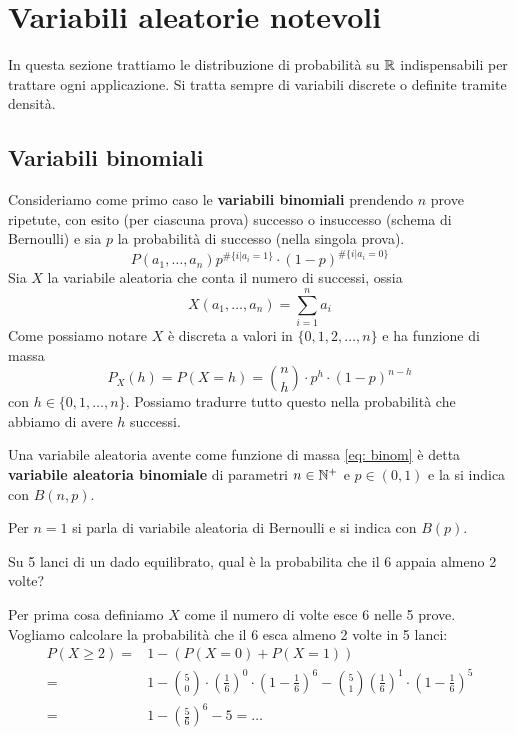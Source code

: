 \section{Variabili aleatorie notevoli}
In questa sezione trattiamo le distribuzione di probabilità su $\mathbb{R}$ indispensabili per trattare
ogni applicazione. Si tratta sempre di variabili discrete o definite tramite densità.

\subsection{Variabili binomiali}
Consideriamo come primo caso le \textbf{variabili binomiali} prendendo $n$ prove ripetute, con
esito (per ciascuna prova) successo o insuccesso (schema di Bernoulli) e sia $p$ la probabilità di
successo (nella singola prova).
\[ P(a_1, \dots, a_n) p^{\# \{i | a_i=1\}} \cdot (1-p)^{\# \{ i | a_i=0 \}} \]
Sia $X$ la variabile aleatoria che conta il numero di successi, ossia
\[ X(a_1, \dots, a_n) = \sum_{i=1}^n a_i \]
Come possiamo notare $X$ è discreta a valori in $\{0,1,2,\dots,n\}$ e ha funzione di massa
\begin{equation}\label{eq: binom}
	P_X(h) = P(X = h) = \binom{n}{h} \cdot p^h \cdot (1-p)^{n-h}
\end{equation}
con $h \in \{ 0, 1, \dots, n \}$. Possiamo tradurre tutto questo nella probabilità che abbiamo di
avere $h$ successi.

Una variabile aleatoria avente come funzione di massa \ref{eq: binom} è detta
\textbf{variabile aleatoria binomiale} di parametri $n \in \mathbb{N}^+$ e $p \in (0,1)$ e la si indica
con $B(n, p)$.

\begin{observation}
	Per $n=1$ si parla di variabile aleatoria di Bernoulli e si indica con $B(p)$.
\end{observation}

\begin{example}
	Su 5 lanci di un dado equilibrato, qual è la probabilita che il 6 appaia almeno 2 volte?

	Per prima cosa definiamo $X$ come il numero di volte esce 6 nelle 5 prove. Vogliamo calcolare
	la probabilità che il 6 esca almeno 2 volte in 5 lanci:
	\begin{align*}
		P(X \geq 2) = & 1 - (P(X = 0) + P(X = 1))                               \\
		=             & 1 - \binom{5}{0} \cdot \left(\frac{1}{6}\right)^0 \cdot
		\left(1 - \frac{1}{6}\right)^{6} - \binom{5}{1} \left(\frac{1}{6}\right)^1 \cdot
		\left(1 - \frac{1}{6}\right)^5                                          \\
		=             & 1 - \left( \frac{5}{6} \right)^6 - 5 = \dots
	\end{align*}
\end{example}

